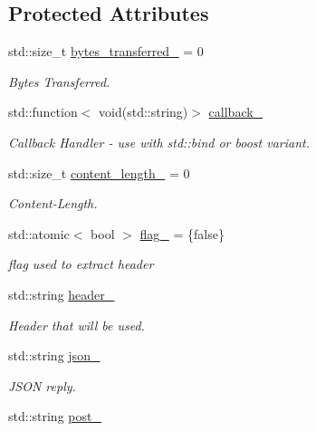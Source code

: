 \subsection*{Protected Attributes}
\begin{DoxyCompactItemize}
\item 
std\-::size\-\_\-t \hyperlink{classrapp_1_1cloud_1_1asio__handler_a4c34ea05512283dade9bcdcf5b7c589e}{bytes\-\_\-transferred\-\_\-} = 0
\begin{DoxyCompactList}\small\item\em Bytes Transferred. \end{DoxyCompactList}\item 
std\-::function$<$ void(std\-::string)$>$ \hyperlink{classrapp_1_1cloud_1_1asio__handler_a3a10b61382fd8ae1be4d0208228cbe00}{callback\-\_\-}
\begin{DoxyCompactList}\small\item\em Callback Handler -\/ use with std\-::bind or boost variant. \end{DoxyCompactList}\item 
std\-::size\-\_\-t \hyperlink{classrapp_1_1cloud_1_1asio__handler_add9ab3624ffe98259435ba5bdf37b8f2}{content\-\_\-length\-\_\-} = 0
\begin{DoxyCompactList}\small\item\em Content-\/\-Length. \end{DoxyCompactList}\item 
std\-::atomic$<$ bool $>$ \hyperlink{classrapp_1_1cloud_1_1asio__handler_aab1f045ee4c4e3b3d931513d91ef9524}{flag\-\_\-} = \{false\}
\begin{DoxyCompactList}\small\item\em flag used to extract header \end{DoxyCompactList}\item 
std\-::string \hyperlink{classrapp_1_1cloud_1_1asio__handler_aa43515d00f301b7c2fe098c6cfcfe518}{header\-\_\-}
\begin{DoxyCompactList}\small\item\em Header that will be used. \end{DoxyCompactList}\item 
std\-::string \hyperlink{classrapp_1_1cloud_1_1asio__handler_a1a4fecd26c43b20bb7b1349c9f494eb2}{json\-\_\-}
\begin{DoxyCompactList}\small\item\em J\-S\-O\-N reply. \end{DoxyCompactList}\item 
std\-::string \hyperlink{classrapp_1_1cloud_1_1asio__handler_af7ee580670c0758a7d5b064b196f63dd}{post\-\_\-}

\end{DoxyCompactItemize}
